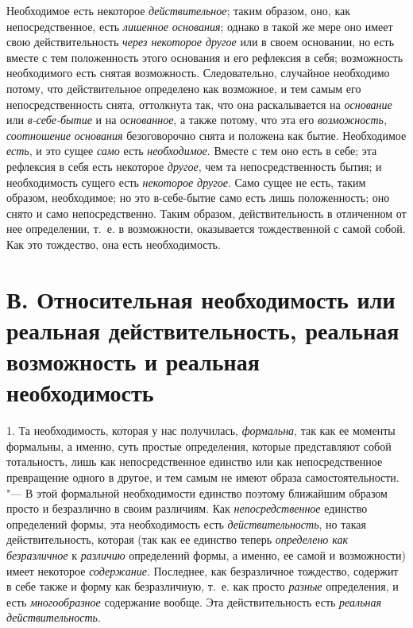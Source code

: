 Необходимое есть некоторое {\em действительное}; таким
образом, оно, как непосредственное, есть {\em лишенное
основания}; однако в такой же мере оно имеет свою действительность
{\em через некоторое другое} или в своем основании, но
есть вместе с тем положенность этого основания и его рефлексия в себя;
возможность необходимого есть снятая возможность. Следовательно, случайное
необходимо потому, что действительное определено как возможное, и тем самым
его непосредственность снята, оттолкнута так, что она раскалывается на
{\em основание} или
{\em в-себе-бытие} и на
{\em основанное}, а также потому, что эта его
{\em возможность, соотношение основания} безоговорочно
снята и положена как бытие. Необходимое {\em есть}, и
это сущее {\em само} есть
{\em необходимое}. Вместе с тем оно есть в себе; эта
рефлексия в себя есть некоторое {\em другое}, чем та
непосредственность бытия; и необходимость сущего есть
{\em некоторое другое}. Само сущее не есть, таким
образом, необходимое; но это в-себе-бытие само есть лишь положенность; оно
снято и само непосредственно. Таким образом, действительность в отличенном
от нее определении, т.~е. в возможности, оказывается тождественной с самой
собой. Как это тождество, она есть необходимость.


\section[В. Относительная необходимость или реальная действительность, реальная возможность и реальная необходимость]
{В. Относительная необходимость или реальная действительность, реальная возможность и реальная необходимость}

1. Та необходимость, которая у нас получилась,
{\em формальна}, так как ее моменты формальны, а
именно, суть простые определения, которые представляют собой тотальностъ,
лишь как непосредственное единство или как непосредственное превращение
одного в другое, и тем самым не имеют образа самостоятельности. "--- В этой
формальной необходимости единство поэтому ближайшим образом просто и
безразлично в своим различиям. Как
{\em непосредственное} единство определений формы, эта
необходимость есть {\em действительность}, но такая
действительность, которая (так как ее единство теперь
{\em определено как безразличное} к
{\em различию} определений формы, а именно, ее самой и
возможности) имеет некоторое {\em содержание}.
Последнее, как безразличное тождество, содержит в себе также и форму как
безразличную, т.~е. как просто {\em разные}
определения, и есть {\em многообразное} содержание
вообще. Эта действительность есть {\em реальная
действительность}.

